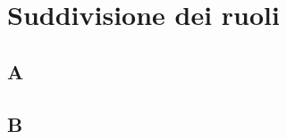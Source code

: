 \documentclass[../relazione.tex]{subfiles}
\begin{document}
\section{Suddivisione dei ruoli}
	\subsection{A}
	\subsection{B}
\end{document}

